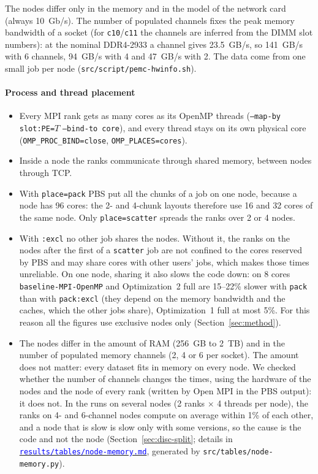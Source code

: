 \documentclass[conference,onecolumn]{IEEEtran}
\newcommand{\vbase}{\texttt{baseline-\allowbreak MPI-\allowbreak OpenMP}}
\newcommand{\repolink}[1]{\href{https://github.com/HPC-2627/ParallelExpectationMaximizationClustering/tree/main/#1}{\textcolor{blue}{\nolinkurl{#1}}}}
\begin{document}
The nodes differ only in the memory and in the model of the network card (always 10~Gb/s). The number of populated channels fixes the peak memory bandwidth of a socket (for \texttt{c10}/\texttt{c11} the channels are inferred from the DIMM slot numbers): at the nominal DDR4-2933 a channel gives 23.5~GB/s, so 141~GB/s with 6 channels, 94~GB/s with 4 and 47~GB/s with 2. The data come from one small job per node (\texttt{src/script/pemc-hwinfo.sh}).


\paragraph{Process and thread placement}
\begin{itemize}
\item Every MPI rank gets as many cores as its OpenMP threads (\texttt{--map-by slot:PE=}$T$ \texttt{--bind-to core}), and every thread stays on its own physical core (\texttt{OMP\_PROC\_BIND=close}, \texttt{OMP\_PLACES=cores}).
\item Inside a node the ranks communicate through shared memory, between nodes through TCP.
\item With \texttt{place=pack} PBS put all the chunks of a job on one node, because a node has 96 cores: the 2- and 4-chunk layouts therefore use 16 and 32 cores of the same node. Only \texttt{place=scatter} spreads the ranks over 2 or 4 nodes.
\item With \texttt{:excl} no other job shares the nodes. Without it, the ranks on the nodes after the first of a \texttt{scatter} job are not confined to the cores reserved by PBS and may share cores with other users' jobs, which makes those times unreliable. On one node, sharing it also slows the code down: on 8 cores \vbase{} and Optimization~2 full are 15--22\% slower with \texttt{pack} than with \texttt{pack:excl} (they depend on the memory bandwidth and the caches, which the other jobs share), Optimization~1 full at most 5\%. For this reason all the figures use exclusive nodes only (Section~\ref{sec:method}).
\item The nodes differ in the amount of RAM (256~GB to 2~TB) and in the number of populated memory channels (2, 4 or 6 per socket). The amount does not matter: every dataset fits in memory on every node. We checked whether the number of channels changes the times, using the hardware of the nodes and the node of every rank (written by Open MPI in the PBS output): it does not. In the runs on several nodes (2 ranks $\times$ 4 threads per node), the ranks on 4- and 6-channel nodes compute on average within 1\% of each other, and a node that is slow is slow only with some versions, so the cause is the code and not the node (Section~\ref{sec:disc-split}; details in \repolink{results/tables/node-memory.md}, generated by \texttt{src/tables/node-memory.py}).
\end{itemize}
\end{document}

